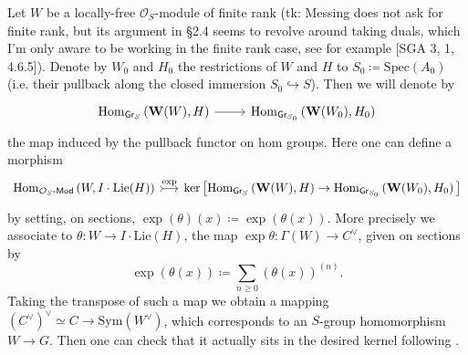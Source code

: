 \documentclass[../Main]{subfiles}
\begin{document}
\begin{defn}
	Let $W$ be a locally-free $\mathcal{O}_{ S }$-module of finite rank
	(tk: Messing does not ask for finite rank, but its argument in \S2.4
	seems to revolve around taking duals, which I'm only aware to be working
	in the finite rank case, see for example [SGA 3, 1, 4.6.5]).
	Denote by $W_0$ and $H_0$ the restrictions of $W$ and $H$ to 
	$S_0 \coloneqq \mathrm{Spec}(A_0)$ (i.e. their pullback along
	the closed immersion $S_0 \hookrightarrow S$).
	Then we will denote by 
	\begin{equation*}
	\begin{tikzcd}[row sep = 0ex
		,/tikz/column 1/.append style={anchor=base east}
		,/tikz/column 2/.append style={anchor=base west}]
		\mathrm{Hom}_{ \mathsf{Gr}_S } 
		\left( \mathbf{W}(W), H \right)
		\arrow[r, "", rightarrow] &
		\mathrm{Hom}_{ \mathsf{Gr}_{S_0} }
		\left( \mathbf{W}(W_0), H_0 \right)
	\end{tikzcd}
	\end{equation*} 
	the map induced by the pullback functor on hom groups.
	Here one can define a morphism
	\begin{equation*}
	\begin{tikzcd}[row sep = 0ex, column sep = 1.5em
		,/tikz/column 1/.append style={anchor=base east}
		,/tikz/column 2/.append style={anchor=base west}]
		\mathrm{Hom}_{ \mathcal{O}_{ S }\text{-}\mathsf{Mod} }
		\left( W, I \cdot \mathrm{Lie}(H) \right)
		\arrow[r, "\exp", rightarrowtail] &
		\ker \big[ 
		\mathrm{Hom}_{ \mathsf{Gr}_S } 
		\left( \mathbf{W}(W), H \right)
		\to
		\mathrm{Hom}_{ \mathsf{Gr}_{S_0} }
		\left( \mathbf{W}(W_0), H_0 \right)
		\big]
	\end{tikzcd}
	\end{equation*} 
	by setting, on sections,
	$\exp (\theta) (x) \coloneqq \exp \left( \theta(x) \right)$.
	More precisely we associate to $\theta\colon W \to I \cdot \mathrm{Lie}(H)$,
	the map $\exp \theta\colon \Gamma(W) \to C^\vee$, given on sections by
	\begin{equation*}
	\exp \left( \theta(x) \right) \coloneqq
	\sum_{n\geq 0 } (\theta(x))^{(n)}
	.\end{equation*}
	Taking the transpose of such a map we obtain a mapping 
	$(C^\vee)^\vee \simeq C \to \mathrm{Sym}(W^\vee)$, which corresponds
	to an $S$-group homomorphism $W \to G$.
	Then one can check that it actually sits in the desired kernel
	following \cite[Chapter III, \S2.4, 2.6]{Messing}.
\end{defn}
\end{document}
